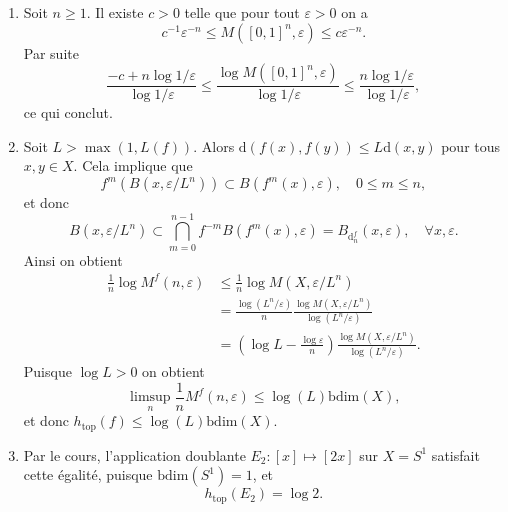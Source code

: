 \documentclass[a4paper,10pt,openany]{article}
\theoremstyle{plain}
\theoremstyle{definition}
\newcommand{\dd}{\mathrm{d}}
\newcommand{\htop}{h_\mathrm{top}}
\begin{document}
\begin{enumerate}
\item Soit $n \geqslant 1$. Il existe $c > 0$ telle que pour tout $\varepsilon > 0$ on a
$$
c^{-1} \varepsilon^{-n} \leqslant M([0,1]^n, \varepsilon) \leqslant c  \varepsilon^{-n}.
$$
Par suite
$$
\frac{-c + n \log 1/ \varepsilon}{\log 1 / \varepsilon} \leqslant \frac{\log M([0,1]^n, \varepsilon)}{\log 1/\varepsilon} \leqslant \frac{n \log 1/\varepsilon}{\log 1 / \varepsilon},
$$
ce qui conclut.

\item Soit $L > \max(1, L(f)).$ Alors $\dd(f(x), f(y)) \leqslant L \dd(x,y)$ pour tous $x,y \in X$. Cela implique que
$$
f^m\left(B(x, \varepsilon / L^n)\right) \subset B(f^m(x), \varepsilon), \quad 0 \leqslant m \leqslant n,
$$
et donc 
$$
B(x, \varepsilon / L^n) \subset \bigcap_{m=0}^{n-1} f^{-m} B(f^m(x), \varepsilon) = B_{\dd^f_n}(x, \varepsilon), \quad \forall x, \varepsilon.
$$
Ainsi on obtient
$$
\begin{aligned}
\frac{1}{n} \log M^f(n, \varepsilon) &\leqslant \frac{1}{n} \log M(X, \varepsilon / L^n) \\
&= \frac{\log(L^n/ \varepsilon)}{n} \frac{\log M(X, \varepsilon / L^n)}{\log(L^n/ \varepsilon)} \\
&= \left(\log L - \frac{\log \varepsilon}{n}\right) \frac{\log M(X, \varepsilon / L^n)}{\log(L^n/ \varepsilon)}.
\end{aligned}
$$
Puisque $\log L > 0$ on obtient 
$$
\limsup_n \frac{1}{n} M^f(n, \varepsilon) \leqslant \log(L) \mathrm{bdim}(X),
$$
et donc $\htop(f) \leqslant \log(L) \mathrm{bdim}(X)$.

\item Par le cours, l'application doublante $E_2 : [x] \mapsto [2x]$ sur $X = S^1$ satisfait cette \'egalit\'e, puisque $\mathrm{bdim}(S^1) = 1$, et 
$$\htop(E_2) = \log 2.$$
\end{enumerate}
\vspace{0.6cm}

 \vspace{1.5mm} 
\end{document}
